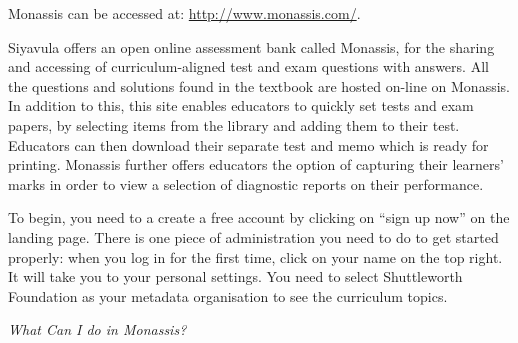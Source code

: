 {\Large
Monassis can be accessed at: \underline{http://www.monassis.com/}.\par 

Siyavula offers an open online assessment bank called Monassis, for the sharing and accessing of curriculum-aligned test and exam questions with answers. All the questions and solutions found in the textbook are hosted on-line on Monassis. In addition to this, this site enables educators to quickly set tests and exam papers, by selecting items from the library and adding them to their test. Educators can then download their separate test and memo which is ready for printing. Monassis further offers educators the option of capturing their learners' marks in order to view a selection of diagnostic reports on their performance.\par 

To begin, you need to a create a free account by clicking on “sign up now” on the landing page. There is one piece of administration you need to do to get started properly: when you log in for the first time, click on your name on the top right. It will take you to your personal settings. You need to select Shuttleworth Foundation as your metadata organisation to see the curriculum topics.\par 

{\normalfont\sffamily\fontsize{16}\normalfont\itshape What Can I do in Monassis?}\par 

\begin{figure}[h]
\begin{center}
\end{center}
\end{figure}








}
